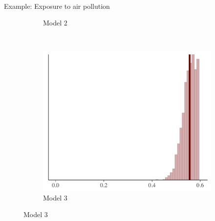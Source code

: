 \documentclass[t]{beamer}
\begin{document}
\begin{frame}{Example: Exposure to air pollution}
\begin{figure}
\begin{subfigure}{0.31\textwidth}
\caption{Model 2}
\end{subfigure}
~
\begin{subfigure}{0.31\textwidth}
\includegraphics[width=\textwidth]{ppc_skew3.png}
\caption{Model 3}
\end{subfigure}

\end{figure}

\end{frame}
\end{document}

